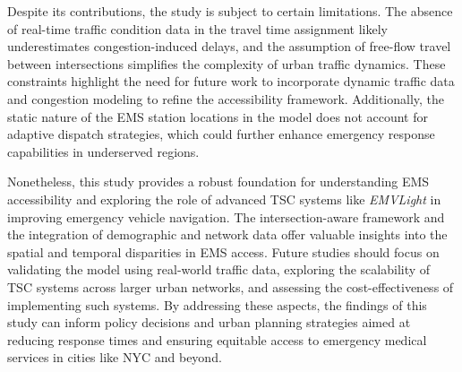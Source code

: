 Despite its contributions, the study is subject to certain limitations. The absence of real-time traffic condition data in the travel time assignment likely underestimates congestion-induced delays, and the assumption of free-flow travel between intersections simplifies the complexity of urban traffic dynamics. These constraints highlight the need for future work to incorporate dynamic traffic data and congestion modeling to refine the accessibility framework. Additionally, the static nature of the EMS station locations in the model does not account for adaptive dispatch strategies, which could further enhance emergency response capabilities in underserved regions.

Nonetheless, this study provides a robust foundation for understanding EMS accessibility and exploring the role of advanced TSC systems like \textit{EMVLight} in improving emergency vehicle navigation. The intersection-aware framework and the integration of demographic and network data offer valuable insights into the spatial and temporal disparities in EMS access. Future studies should focus on validating the model using real-world traffic data, exploring the scalability of TSC systems across larger urban networks, and assessing the cost-effectiveness of implementing such systems. By addressing these aspects, the findings of this study can inform policy decisions and urban planning strategies aimed at reducing response times and ensuring equitable access to emergency medical services in cities like NYC and beyond.

